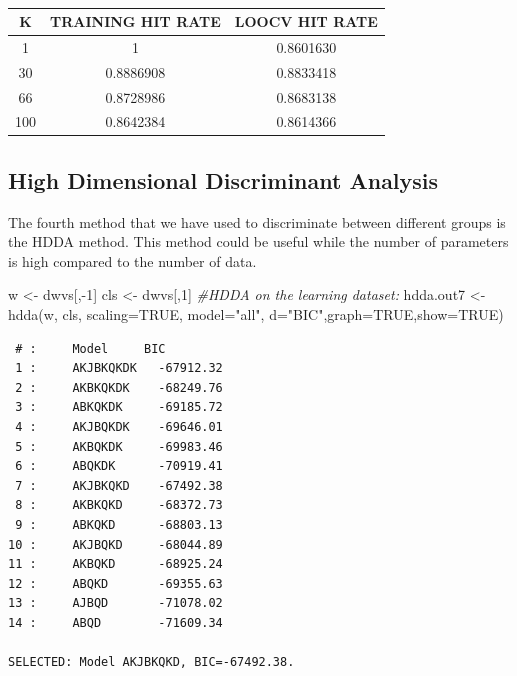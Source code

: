 \documentclass[
  11pt,
]{article}
\newenvironment{Shaded}{\begin{snugshade}}{\end{snugshade}}
\newcommand{\AttributeTok}[1]{\textcolor[rgb]{0.77,0.63,0.00}{#1}}
\newcommand{\CommentTok}[1]{\textcolor[rgb]{0.56,0.35,0.01}{\textit{#1}}}
\newcommand{\ConstantTok}[1]{\textcolor[rgb]{0.00,0.00,0.00}{#1}}
\newcommand{\DecValTok}[1]{\textcolor[rgb]{0.00,0.00,0.81}{#1}}
\newcommand{\FunctionTok}[1]{\textcolor[rgb]{0.00,0.00,0.00}{#1}}
\newcommand{\NormalTok}[1]{#1}
\newcommand{\OtherTok}[1]{\textcolor[rgb]{0.56,0.35,0.01}{#1}}
\newcommand{\SpecialCharTok}[1]{\textcolor[rgb]{0.00,0.00,0.00}{#1}}
\newcommand{\StringTok}[1]{\textcolor[rgb]{0.31,0.60,0.02}{#1}}
\begin{document}
\begin{table}[h!]
  \begin{center}
    \caption{}
    \label{tab:}
    \begin{tabular}{c|c|c} %
      \textbf{K} & \textbf{TRAINING HIT RATE} & \textbf{LOOCV HIT RATE}\\
      \hline
      1 & 1 & 0.8601630\\
      30 & 0.8886908 & 0.8833418\\
      66 & 0.8728986 & 0.8683138\\
      100 & 0.8642384 & 0.8614366\\
    \end{tabular}
  \end{center}
\end{table}

\hypertarget{high-dimensional-discriminant-analysis}{%
\subsection{High Dimensional Discriminant Analysis}\label{high-dimensional-discriminant-analysis}}

The fourth method that we have used to discriminate between different groups is the HDDA method. This method could be useful while the number of parameters is high compared to the number of data.

\begin{Shaded}
\begin{Highlighting}[]
\NormalTok{w }\OtherTok{\textless{}{-}}\NormalTok{ dwvs[,}\SpecialCharTok{{-}}\DecValTok{1}\NormalTok{]}
\NormalTok{cls }\OtherTok{\textless{}{-}}\NormalTok{ dwvs[,}\DecValTok{1}\NormalTok{]}
\CommentTok{\#HDDA on the learning dataset:}
\NormalTok{hdda.out7 }\OtherTok{\textless{}{-}} \FunctionTok{hdda}\NormalTok{(w, cls, }\AttributeTok{scaling=}\ConstantTok{TRUE}\NormalTok{, }\AttributeTok{model=}\StringTok{"all"}\NormalTok{, }\AttributeTok{d=}\StringTok{"BIC"}\NormalTok{,}\AttributeTok{graph=}\ConstantTok{TRUE}\NormalTok{,}\AttributeTok{show=}\ConstantTok{TRUE}\NormalTok{) }
\end{Highlighting}
\end{Shaded}

\begin{verbatim}
 # :     Model     BIC
 1 :     AKJBKQKDK   -67912.32  
 2 :     AKBKQKDK    -68249.76  
 3 :     ABKQKDK     -69185.72  
 4 :     AKJBQKDK    -69646.01  
 5 :     AKBQKDK     -69983.46  
 6 :     ABQKDK      -70919.41  
 7 :     AKJBKQKD    -67492.38  
 8 :     AKBKQKD     -68372.73  
 9 :     ABKQKD      -68803.13  
10 :     AKJBQKD     -68044.89  
11 :     AKBQKD      -68925.24  
12 :     ABQKD       -69355.63  
13 :     AJBQD       -71078.02  
14 :     ABQD        -71609.34  

SELECTED: Model AKJBKQKD, BIC=-67492.38.
\end{verbatim}
\end{document}

